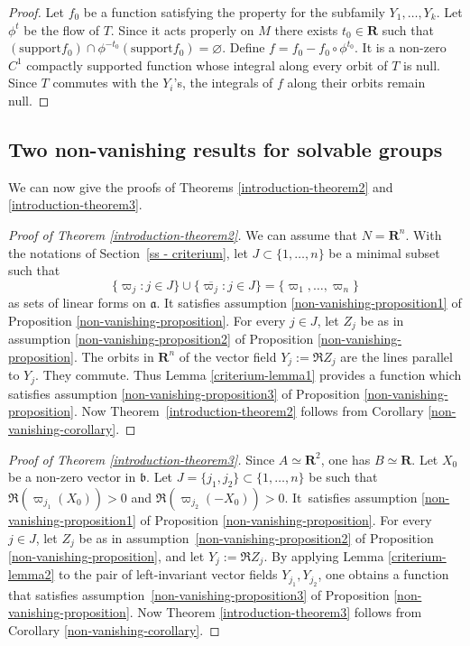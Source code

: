\documentclass[JEP,XML,SOM,Unicode,published]{cedram}
\newcommand{\fra}{\mathfrak{a}}
\newcommand{\frb}{\mathfrak{b}}
\newcommand{\RR}{\mathbf{R}}
\theoremstyle{plain}
\theoremstyle{remark}
\theoremstyle{definition}
\begin{document}
\begin{proof} Let $f_0$ be a function satisfying the property for the subfamily $Y_1, \dots, Y_k$. Let $\phi^t$ be the flow of $T$.
Since it acts properly on $M$ there exists $t_0 \in\RR$ such that
$(\text{support}f_0) \cap \phi^{-t_0}(\text{support}f_0) = \varnothing$.
Define $f = f_0 - f_0 \circ \phi^{t_0}$. It is a non-zero $C^1$ compactly supported function whose integral along every orbit of $T$ is null.
Since $T$ commutes with the $Y_i$'s, the integrals of $f$ along their orbits remain null.
\end{proof}

\subsection{Two non-vanishing results for solvable groups}
We can now give the proofs of Theorems \ref{introduction-theorem2} and \ref{introduction-theorem3}.

\begin{proof}[Proof of Theorem
\ref{introduction-theorem2}]
We can assume that $N = \RR^n$.
With the notations of Section~\ref{ss - criterium}, let $J \subset \{1, \dots, n\}$ be a minimal subset such that
\[\{\varpi_j: j \in J\} \cup \{\overline{\varpi_j}: j \in J \} = \{\varpi_1, \dots, \varpi_n\}\]
as sets of linear forms on $\fra$. It satisfies assumption
\eqref{non-vanishing-proposition1} of Proposition \ref{non-vanishing-proposition}.
For every $j \in J$, let $Z_j$ be as in assumption \eqref{non-vanishing-proposition2} of Proposition \ref{non-vanishing-proposition}.
The orbits in $\RR^n$ of the vector field $Y_j:= \Re Z_j$ are the lines parallel to $Y_j$.
They commute. Thus Lemma \ref{criterium-lemma1} provides a function which satisfies assumption \eqref{non-vanishing-proposition3} of
Proposition \ref{non-vanishing-proposition}.
Now Theorem~\ref{introduction-theorem2} follows from Corollary \ref{non-vanishing-corollary}.
\end{proof}

\begin{proof}[Proof of Theorem
\ref{introduction-theorem3}]
Since $A \simeq \RR^2$, one has $B \simeq \RR$. Let $X_0$ be a non-zero vector in $\frb$.
Let $J = \{j_1, j_2\} \!\subset\! \{1, \dots, n\}$
be such that $\Re (\varpi_{j_1} (X_0)) \!>\!0$ and \hbox{$\Re (\varpi_{j_2} (-X_0)) \!>\!0$}. It~satisfies assumption
\eqref{non-vanishing-proposition1} of Proposition \ref{non-vanishing-proposition}.
For every $j \!\in\! J$, let $Z_j$ be as in \hbox{assumption \eqref{non-vanishing-proposition2}} of Proposition \ref{non-vanishing-proposition}, and let
$Y_j:= \Re Z_j$. By applying Lemma \ref{criterium-lemma2} to the pair of left-invariant vector fields $Y_{j_1}, Y_{j_2}$,
one obtains a function that satisfies assumption~\eqref{non-vanishing-proposition3} of
Proposition \ref{non-vanishing-proposition}.
Now Theorem \ref{introduction-theorem3} follows from Corollary \ref{non-vanishing-corollary}.
\end{proof}
\end{document}
